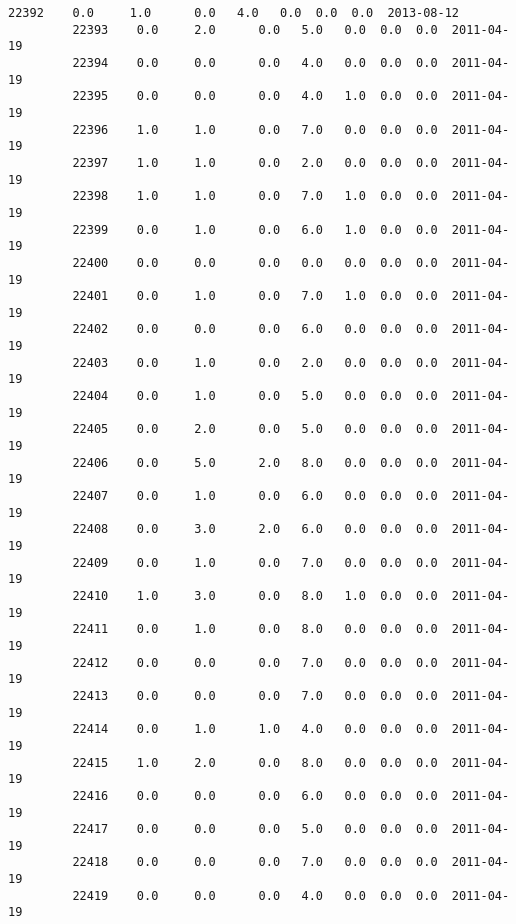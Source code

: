 \documentclass[11pt]{article}
\begin{document}
\begin{Verbatim}[commandchars=\\\{\}]
         22392    0.0     1.0      0.0   4.0   0.0  0.0  0.0  2013-08-12   
         22393    0.0     2.0      0.0   5.0   0.0  0.0  0.0  2011-04-19   
         22394    0.0     0.0      0.0   4.0   0.0  0.0  0.0  2011-04-19   
         22395    0.0     0.0      0.0   4.0   1.0  0.0  0.0  2011-04-19   
         22396    1.0     1.0      0.0   7.0   0.0  0.0  0.0  2011-04-19   
         22397    1.0     1.0      0.0   2.0   0.0  0.0  0.0  2011-04-19   
         22398    1.0     1.0      0.0   7.0   1.0  0.0  0.0  2011-04-19   
         22399    0.0     1.0      0.0   6.0   1.0  0.0  0.0  2011-04-19   
         22400    0.0     0.0      0.0   0.0   0.0  0.0  0.0  2011-04-19   
         22401    0.0     1.0      0.0   7.0   1.0  0.0  0.0  2011-04-19   
         22402    0.0     0.0      0.0   6.0   0.0  0.0  0.0  2011-04-19   
         22403    0.0     1.0      0.0   2.0   0.0  0.0  0.0  2011-04-19   
         22404    0.0     1.0      0.0   5.0   0.0  0.0  0.0  2011-04-19   
         22405    0.0     2.0      0.0   5.0   0.0  0.0  0.0  2011-04-19   
         22406    0.0     5.0      2.0   8.0   0.0  0.0  0.0  2011-04-19   
         22407    0.0     1.0      0.0   6.0   0.0  0.0  0.0  2011-04-19   
         22408    0.0     3.0      2.0   6.0   0.0  0.0  0.0  2011-04-19   
         22409    0.0     1.0      0.0   7.0   0.0  0.0  0.0  2011-04-19   
         22410    1.0     3.0      0.0   8.0   1.0  0.0  0.0  2011-04-19   
         22411    0.0     1.0      0.0   8.0   0.0  0.0  0.0  2011-04-19   
         22412    0.0     0.0      0.0   7.0   0.0  0.0  0.0  2011-04-19   
         22413    0.0     0.0      0.0   7.0   0.0  0.0  0.0  2011-04-19   
         22414    0.0     1.0      1.0   4.0   0.0  0.0  0.0  2011-04-19   
         22415    1.0     2.0      0.0   8.0   0.0  0.0  0.0  2011-04-19   
         22416    0.0     0.0      0.0   6.0   0.0  0.0  0.0  2011-04-19   
         22417    0.0     0.0      0.0   5.0   0.0  0.0  0.0  2011-04-19   
         22418    0.0     0.0      0.0   7.0   0.0  0.0  0.0  2011-04-19   
         22419    0.0     0.0      0.0   4.0   0.0  0.0  0.0  2011-04-19   
         

\end{Verbatim}
\end{document}
